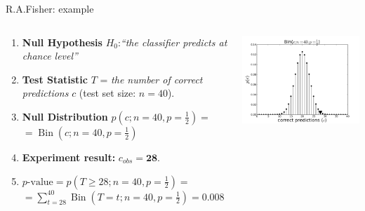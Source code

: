 \documentclass[aspectratio=169]{beamer}
\newcommand{\Bin}{\operatorname{{\mathrm Bin}}}
\begin{document}
\begin{frame}{R.A.Fisher: example}
  \begin{columns}
    \small
    \begin{column}{0.6\linewidth}
      \begin{enumerate}
      \item \textbf{Null Hypothesis} $H_0$:\emph{``the classifier predicts at chance level''}
      \item \textbf{Test Statistic} $T$ = \emph{the number of correct predictions} $c$
        (test set size: $n=40$).
      \item \textbf{Null Distribution} $p(c; n=40, p=\frac{1}{2}) =$\\
        $= \Bin(c; n=40, p=\frac{1}{2})$ %
      \item \textbf{Experiment result:} $c_{obs} = \mathbf{28}$.
      \item $p\text{-value} = p(T \geq 28 ; n=40, p=\frac{1}{2}) =$\\
        $= \sum_{t=28}^{40}\Bin(T=t; n=40, p=\frac{1}{2}) = \mathbf{0.008}$
      \end{enumerate}
    \end{column}
    \begin{column}{0.6\linewidth}
      \includegraphics[width=7.0cm]{binomial_pmf_c28_n40}
    \end{column}
  \end{columns}
\end{frame}
\end{document}
